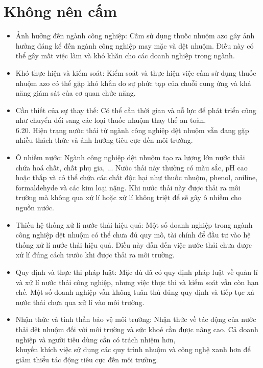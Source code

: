 \documentclass[10pt]{article}
\begin{document}
\section*{Không nên cấm}
\begin{itemize}
  \item Ảnh hưởng đến ngành công nghiệp: Cấm sử dụng thuốc nhuộm azo gây ảnh hưởng đáng kể đến ngành công nghiệp may mặc và dệt nhuộm. Điều này có thể gây mất việc làm và khó khăn cho các doanh nghiệp trong ngành.
  \item Khó thực hiện và kiểm soát: Kiểm soát và thực hiện việc cấm sử dụng thuốc nhuộm azo có thể gặp khó khắn do sự phức tạp của chuỗi cung ứng và khả năng giám sát của cơ quan chức năng.
  \item Cần thiết của sự thay thế: Có thể cần thời gian và nỗ lực để phát triển cũng như chuyển đổi sang các loại thuốc nhuộm thay thế an toàn.\\
6.20. Hiện trạng nưởc thải từ ngành công nghiệp dệt nhuộm vẫn đang gặp nhiều thách thức và ảnh hưởng tiêu cực đến môi trường.
  \item Ô nhiễm nước: Ngành công nghiệp dệt nhuộm tạo ra lượng lớn nước thải chứa hoá chất, chất phụ gia, ... Nước thải này thường có màu sắc, pH cao hoặc thấp và có thể chứa các chất độc hại như thuốc nhuộm, phenol, aniline, formaldehyde và các kim loại nặng. Khi nước thải này được thải ra môi trường mà không qua xử lí hoặc xử lí không triệt để sẽ gây ô nhiễm cho nguồn nước.
  \item Thiếu hệ thống xử lí nước thải hiệu quả: Một số doanh nghiệp trong ngành công nghiệp dệt nhuộm có thể chưa đủ quy mô, tài chính để đầu tư vào hệ thống xử lí nước thải hiệu quả. Điều này dẫn đến việc nước thải chưa được xử lí đúng cách trước khi được thải ra môi trường.
  \item Quy định và thực thi pháp luật: Mặc dù đã có quy định pháp luật về quản lí và xử lí nước thải công nghiệp, nhưng việc thực thi và kiểm soát vẫn còn hạn chế. Một số doanh nghiệp vẫn không tuân thủ đúng quy định và tiếp tục xả nước thải chưa qua xử lí vào môi trường.
  \item Nhận thức và tinh thần bảo vệ môi trường: Nhận thức về tác động của nước thải dệt nhuộm đối với môi trường và sức khoẻ cần được nâng cao. Cả doanh nghiệp và người tiêu dùng cần có trách nhiệm hơn,\\
khuyến khích việc sử dụng các quy trình nhuộm và công nghệ xanh hơn để giảm thiểu tác động tiêu cực đến môi trường.
\end{itemize}
\end{document}
